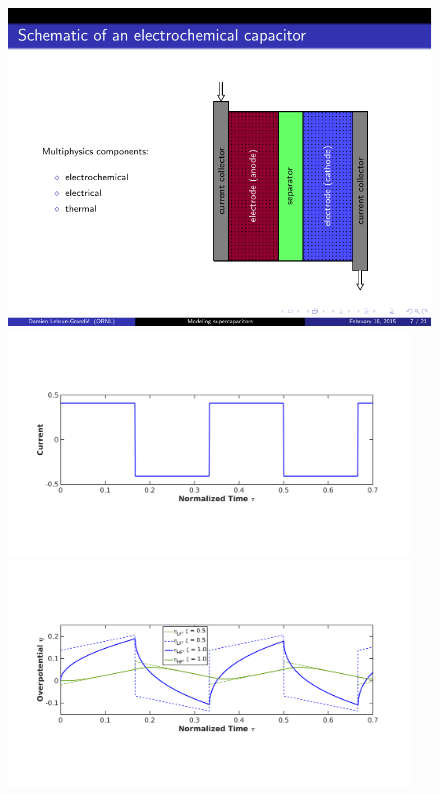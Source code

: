 \documentclass[8pt]{beamer}
\begin{document}
\begin{frame}
\begin{columns}
\begin{column}{.4\textwidth}
\begin{center}
\begin{figure}[h]
    \centering
    \includegraphics[trim = 2.4in 0.4in 0.7in 0.9in, clip, width=.5\textwidth]{figs_report/supercap_schematic.pdf}
    \\    \vspace{0.02in} 
    \includegraphics[trim = 1.3in 2.5in 1.6in 2.8in, clip, width=0.95\textwidth]{figs_report/I.png}
    \\
    \includegraphics[trim = 1.3in 2.5in 1.6in 2.8in, clip, width=0.95\textwidth]{figs_report/etaLF_HF.png}   
\end{figure}
\end{center}
\end{column}
\end{columns}


\end{frame}
\end{document}

